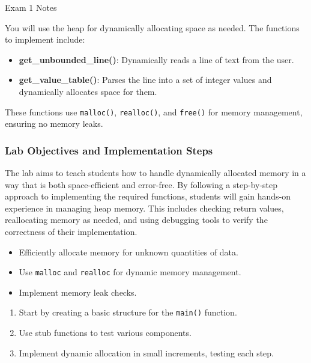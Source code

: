\begin{examnotes}{Exam 1 Notes}
    \begin{highlight}
        You will use the heap for dynamically allocating space as needed. The functions to implement include:
        \begin{itemize}
            \item \textbf{get\_unbounded\_line()}: Dynamically reads a line of text from the user.
            \item \textbf{get\_value\_table()}: Parses the line into a set of integer values and dynamically allocates space for them.
        \end{itemize}
        These functions use \texttt{malloc()}, \texttt{realloc()}, and \texttt{free()} for memory management, ensuring no memory leaks.
    \end{highlight}
    
    \subsubsection*{Lab Objectives and Implementation Steps}
    
    The lab aims to teach students how to handle dynamically allocated memory in a way that is both space-efficient and error-free. By following a step-by-step approach to implementing the required 
    functions, students will gain hands-on experience in managing heap memory. This includes checking return values, reallocating memory as needed, and using debugging tools to verify the correctness 
    of their implementation.
    
    \begin{highlight}
        \begin{itemize}
            \item Efficiently allocate memory for unknown quantities of data.
            \item Use \texttt{malloc} and \texttt{realloc} for dynamic memory management.
            \item Implement memory leak checks.
        \end{itemize}
    \end{highlight}
    
    \begin{highlight}
        \begin{enumerate}
            \item Start by creating a basic structure for the \texttt{main()} function.
            \item Use stub functions to test various components.
            \item Implement dynamic allocation in small increments, testing each step.
        \end{enumerate}
    \end{highlight}


\end{examnotes}
